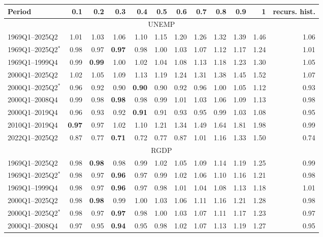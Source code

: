 \begin{tabular}{lrrrrrrrrrrr}
\hline
Period & 0.1 & 0.2 & 0.3 & 0.4 & 0.5 & 0.6 & 0.7 & 0.8 & 0.9 & 1 & recurs. hist. \\
\hline
\multicolumn{12}{c}{UNEMP} \\
1969Q1--2025Q2 & 1.01 & 1.03 & 1.06 & 1.10 & 1.15 & 1.20 & 1.26 & 1.32 & 1.39 & 1.46 & 1.06 \\
1969Q1--2025Q2$^*$ & 0.98 & 0.97 & \textbf{0.97} & 0.98 & 1.00 & 1.03 & 1.07 & 1.12 & 1.17 & 1.24 & 1.01 \\
1969Q1--1999Q4 & 0.99 & \textbf{0.99} & 1.00 & 1.02 & 1.04 & 1.08 & 1.13 & 1.18 & 1.23 & 1.30 & 1.05 \\
2000Q1--2025Q2 & 1.02 & 1.05 & 1.09 & 1.13 & 1.19 & 1.24 & 1.31 & 1.38 & 1.45 & 1.52 & 1.07 \\
2000Q1--2025Q2$^*$ & 0.96 & 0.92 & 0.90 & \textbf{0.90} & 0.90 & 0.92 & 0.96 & 1.00 & 1.05 & 1.12 & 0.93 \\
2000Q1--2008Q4 & 0.99 & 0.98 & \textbf{0.98} & 0.98 & 0.99 & 1.01 & 1.03 & 1.06 & 1.09 & 1.13 & 0.98 \\
2000Q1--2019Q4 & 0.96 & 0.93 & 0.92 & \textbf{0.91} & 0.91 & 0.93 & 0.95 & 0.99 & 1.03 & 1.08 & 0.95 \\
2010Q1--2019Q4 & \textbf{0.97} & 0.97 & 1.02 & 1.10 & 1.21 & 1.34 & 1.49 & 1.64 & 1.81 & 1.98 & 0.99 \\
2022Q1--2025Q2 & 0.87 & 0.77 & \textbf{0.71} & 0.72 & 0.77 & 0.87 & 1.01 & 1.16 & 1.33 & 1.50 & 0.74 \\
\hline
\multicolumn{12}{c}{RGDP} \\
1969Q1--2025Q2 & 0.98 & \textbf{0.98} & 0.98 & 0.99 & 1.02 & 1.05 & 1.09 & 1.14 & 1.19 & 1.25 & 0.99 \\
1969Q1--2025Q2$^*$ & 0.98 & 0.97 & \textbf{0.96} & 0.97 & 0.99 & 1.02 & 1.06 & 1.10 & 1.16 & 1.21 & 0.98 \\
1969Q1--1999Q4 & 0.98 & 0.97 & \textbf{0.96} & 0.97 & 0.98 & 1.01 & 1.04 & 1.08 & 1.13 & 1.18 & 1.01 \\
2000Q1--2025Q2 & 0.98 & \textbf{0.98} & 0.99 & 1.00 & 1.03 & 1.06 & 1.11 & 1.16 & 1.21 & 1.28 & 0.98 \\
2000Q1--2025Q2$^*$ & 0.98 & 0.97 & \textbf{0.97} & 0.98 & 1.00 & 1.03 & 1.07 & 1.11 & 1.17 & 1.23 & 0.97 \\
2000Q1--2008Q4 & 0.97 & 0.95 & \textbf{0.94} & 0.95 & 0.98 & 1.02 & 1.07 & 1.13 & 1.19 & 1.27 & 0.95 \\

\end{tabular}
